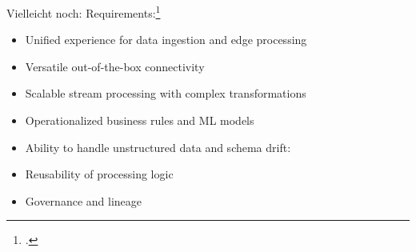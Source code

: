 


Vielleicht noch:
Requirements:\footcite[Vgl.][]{Belur.2020}
\begin{itemize}
\item Unified experience for data ingestion and edge processing
\item Versatile out-of-the-box connectivity
\item Scalable stream processing with complex transformations
\item Operationalized business rules and ML models
\item Ability to handle unstructured data and schema drift:
\item Reusability of processing logic
\item Governance and lineage
\end{itemize}




